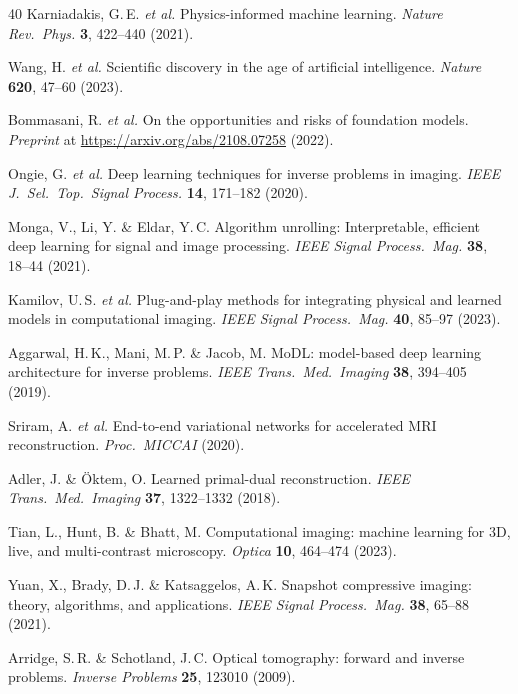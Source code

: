 \documentclass[11pt,a4paper]{article}
\begin{document}
\begin{thebibliography}{40}
Karniadakis, G.\,E. \textit{et al.}
Physics-informed machine learning.
\textit{Nature Rev.\ Phys.} \textbf{3}, 422--440 (2021).

Wang, H. \textit{et al.}
Scientific discovery in the age of artificial intelligence.
\textit{Nature} \textbf{620}, 47--60 (2023).

Bommasani, R. \textit{et al.}
On the opportunities and risks of foundation models.
\textit{Preprint} at \url{https://arxiv.org/abs/2108.07258} (2022).

Ongie, G. \textit{et al.}
Deep learning techniques for inverse problems in imaging.
\textit{IEEE J.\ Sel.\ Top.\ Signal Process.} \textbf{14}, 171--182 (2020).

Monga, V., Li, Y. \& Eldar, Y.\,C.
Algorithm unrolling: Interpretable, efficient deep learning for signal and image processing.
\textit{IEEE Signal Process.\ Mag.} \textbf{38}, 18--44 (2021).

Kamilov, U.\,S. \textit{et al.}
Plug-and-play methods for integrating physical and learned models in computational imaging.
\textit{IEEE Signal Process.\ Mag.} \textbf{40}, 85--97 (2023).

Aggarwal, H.\,K., Mani, M.\,P. \& Jacob, M.
MoDL: model-based deep learning architecture for inverse problems.
\textit{IEEE Trans.\ Med.\ Imaging} \textbf{38}, 394--405 (2019).

Sriram, A. \textit{et al.}
End-to-end variational networks for accelerated MRI reconstruction.
\textit{Proc.\ MICCAI} (2020).

Adler, J. \& {\"O}ktem, O.
Learned primal-dual reconstruction.
\textit{IEEE Trans.\ Med.\ Imaging} \textbf{37}, 1322--1332 (2018).

Tian, L., Hunt, B. \& Bhatt, M.
Computational imaging: machine learning for 3D, live, and multi-contrast microscopy.
\textit{Optica} \textbf{10}, 464--474 (2023).

Yuan, X., Brady, D.\,J. \& Katsaggelos, A.\,K.
Snapshot compressive imaging: theory, algorithms, and applications.
\textit{IEEE Signal Process.\ Mag.} \textbf{38}, 65--88 (2021).

Arridge, S.\,R. \& Schotland, J.\,C.
Optical tomography: forward and inverse problems.
\textit{Inverse Problems} \textbf{25}, 123010 (2009).


\end{thebibliography}
\end{document}
